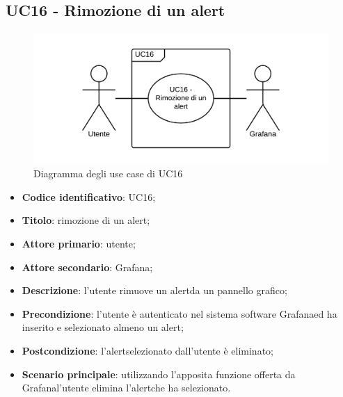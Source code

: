 \subsection{UC16 - Rimozione di un alert}
\begin{figure}[H]
\includegraphics{img/UC16_-_Rimozione_di_un_alert.png}
\caption{Diagramma degli use case di UC16}
\end{figure}
\begin{itemize}
	\item \textbf{Codice identificativo}: UC16;
	\item \textbf{Titolo}: rimozione di un alert\glo;
	\item \textbf{Attore primario}: utente;
	\item \textbf{Attore secondario}: Grafana\glo;
	\item \textbf{Descrizione}: l'utente rimuove un alert\glosp da un pannello grafico;
	\item \textbf{Precondizione}: l'utente è autenticato nel sistema software Grafana\glosp ed ha inserito e selezionato almeno un alert\glo;
	\item \textbf{Postcondizione}: l'alert\glosp selezionato dall'utente è eliminato;
	\item \textbf{Scenario principale}: utilizzando l'apposita funzione offerta da Grafana\glosp l'utente elimina l'alert\glosp che ha selezionato.
\end{itemize} 
